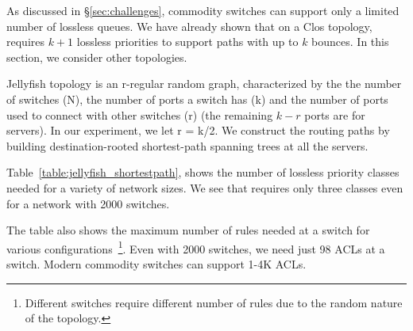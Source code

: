 As discussed in \S\ref{sec:challenges}, commodity switches can support only a
limited number of lossless queues.  We have already shown that on a Clos
topology, \sysname{} requires $k+1$ lossless priorities to support paths with
up to $k$ bounces. In this section, we consider other topologies.

\begin{table}[t]
	\centering
	\caption{Jellyfish with shortest paths.}
	\label{table:jellyfish_shortestpath}
\end{table}

Jellyfish topology is an r-regular random graph, characterized by the the number
of switches (N), the number of ports a switch has (k) and the number of ports
used to connect with other switches (r) (the remaining $k-r$ ports are for
servers). In our experiment, we let r = k/2.  We construct the routing paths by
building destination-rooted shortest-path spanning trees at all the servers.

Table~\ref{table:jellyfish_shortestpath}, shows the number of lossless priority
classes needed for a variety of network sizes. We see that \sysname{} requires
only three classes even for a network with 2000 switches.

The table also shows the maximum number of rules needed at a switch for various
configurations~\footnote{Different switches require different number of rules
due to the random nature of the topology.}. Even with 2000 switches, we need
just 98 ACLs at a switch. Modern commodity switches can support 1-4K ACLs.

